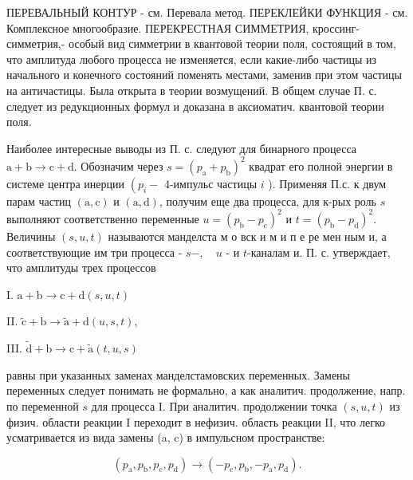 \documentclass[10pt]{article}
\begin{document}
ПЕРЕВАЛЬНЫЙ КОНТУР - см. Перевала метод. ПЕРЕКЛЕЙКИ ФУНКЦИЯ - см. Комплексное многообразие. ПЕРЕКРЕСТНАЯ СИММЕТРИЯ, кроссинг-симметрия,- особый вид симметрии в квантовой теории поля, состоящий в том, что амплитуда любого процесса не изменяется, если какие-либо частицы из начального и конечного состояний поменять местами, заменив при этом частицы на античастицы. Была открыта в теории возмущений. В общем случае П. с. следует из редукционных формул и доказана в аксиоматич. квантовой теории поля.



Наиболее интересные выводы из П. с. следуют для бинарного процесса $\mathrm{a}+\mathrm{b} \rightarrow \mathrm{c}+\mathrm{d}$. Обозначим через $s=\left(p_{\mathrm{a}}+p_{\mathrm{b}}\right)^{2}$ квадрат его полной энергии в системе центра инерции $\left(p_{i}-\right.$ 4-импульс частицы $i$ ). Применяя П.с. к двум парам частиц $(\mathrm{a}, \mathrm{c})$ и $(\mathrm{a}, \mathrm{d})$, получим еще два процесса, для к-рых роль $s$ выполняют соответственно переменные $u=\left(p_{\mathrm{b}}-p_{\mathrm{c}}\right)^{2}$ и $t=\left(p_{\mathrm{b}}-p_{\mathrm{d}}\right)^{2}$. Величины $(s, u, t)$ называются манделста м о вск и м и п е ре мен ным и, а соответствующие им три процесса - $s-, \quad u$ - и $t$-каналам и. П. с. утверждает, что амплитуды трех процессов

I. $\mathrm{a}+\mathrm{b} \rightarrow \mathrm{c}+\mathrm{d}(s, u, t)$

II. $\tilde{\mathrm{c}}+\mathrm{b} \rightarrow \tilde{\mathrm{a}}+\mathrm{d}(u, s, t)$,

III. $\widetilde{\mathrm{d}}+\mathrm{b} \rightarrow \mathrm{c}+\widetilde{\mathrm{a}}(t, u, s)$



равны при указанных заменах манделстамовских переменных. Замены переменных следует понимать не формально, а как аналитич. продолжение, напр. по переменной $s$ для процесса I. При аналитич. продолжении точка $(s, u, t)$ из физич. области реакции I переходит в нефизич. область реакции II, что легко усматривается из вида замены (a, c) в импульсном пространстве:



\[

\left(p_{\mathrm{a}}, p_{\mathrm{b}}, p_{\mathrm{c}}, p_{\mathrm{d}}\right) \rightarrow\left(-p_{\mathrm{c}}, p_{\mathrm{b}},-p_{\mathrm{a}}, p_{\mathrm{d}}\right) .

\]
\end{document}
